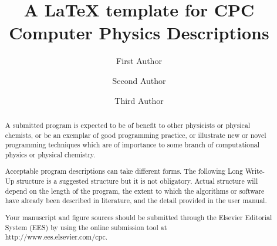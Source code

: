 \documentclass[preprint,12pt]{elsarticle}
\begin{document}
\begin{frontmatter}



\title{A \LaTeX{} template for CPC Computer Physics Descriptions}


\author[a]{First Author}
\author[a,b]{Second Author}
\author[b]{Third Author}

\address[a]{First Address}
\address[b]{Second Address}

\begin{abstract}
A submitted program is expected to be of benefit to other physicists or physical chemists, or be an exemplar of good programming practice, or illustrate new or novel programming techniques which are of importance to some branch of computational physics or physical chemistry.

Acceptable program descriptions can take different forms. The following Long Write-Up structure is a suggested structure but it is not obligatory. Actual structure will depend on the length of the program, the extent to which the algorithms or software have already been described in literature, and the detail provided in the user manual.

Your manuscript and figure sources should be submitted through the Elsevier Editorial System (EES) by using the online submission tool at \\
http://www.ees.elsevier.com/cpc.


\end{abstract}
\end{frontmatter}
\end{document}

